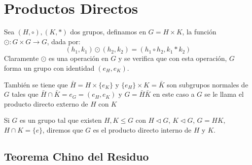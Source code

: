 \section{Productos Directos}
\label{sec:Productos Directos}

\begin{defi}
    Sea $(H, \circ), (K, \ast)$ dos grupos, definamos en $G=H \times K$, la función $\odot : G \times G \to G$, dada por:
\begin{equation*}
     (h_1, k_1) \odot (h_2, k_2) = (h_1 \circ h_2, k_1 * k_2)
\end{equation*}
   Claramente $\odot$ es una operación en $G$ y se verifica que con esta operación, $G$ forma un grupo con identidad $(e_{H}, e_{K})$. \par 
   También se tiene que $\bar{H}= H \times \{ e_K \}$ y $\{ e_H\} \times K = \bar{K}$ son subgrupos normales de $G$ tales que $\bar{H} \cap \bar{K} = e_{G} = (e_H, e_K)$ y $G = \bar{H} \bar{K}$ en este caso a $G$ se le llama el producto directo externo de $H$ con $K$ 
\end{defi}

\begin{defi}
    Si $G$ es un grupo tal que existen $H, K \leq G$ con $H \triangleleft G$, $K \triangleleft G$, $G = HK$, $H \cap K = \{e\}$, diremos que $G$ es el producto directo interno de $H$ y $K$.
\end{defi}


\subsection{Teorema Chino del Residuo}


